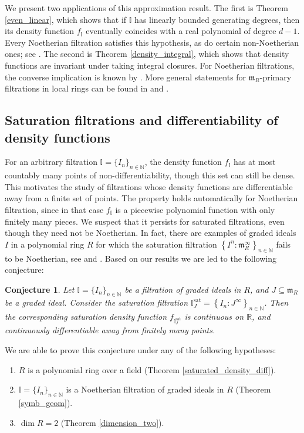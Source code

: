 \documentclass[12pt,a4paper]{amsart}
\theoremstyle{plain}
\newtheorem{conjecture}[theorem]{Conjecture}
\theoremstyle{definition}
\numberwithin{equation}{theorem}
\begin{document}
We present two applications of this approximation result. The first is Theorem \ref{even_linear}, which shows that if $\mathbb{I}$ has linearly bounded generating degrees, then its density function $f_{\mathbb{I}}$ eventually coincides with a real polynomial of degree $d-1$. Every Noetherian filtration satisfies this hypothesis, as do certain non-Noetherian ones; see \cite{HHT02}. The second is Theorem \ref{density_integral}, which shows that density functions are invariant under taking integral closures. For Noetherian filtrations, the converse implication is known by \cite{DRT26}. More general statements for $\mathfrak{m}_R$-primary filtrations in local rings can be found in \cite{Cut21} and \cite{BLQ24}.

\subsection*{Saturation filtrations and differentiability of density functions}

For an arbitrary filtration $\mathbb{I}=\{I_n\}_{n\in\mathbb N}$, the density function $f_{\mathbb{I}}$ has at most countably many points of non-differentiability, though this set can still be dense. This motivates the study of filtrations whose density functions are differentiable away from a finite set of points. The property holds automatically for Noetherian filtration, since in that case $f_{\mathbb{I}}$ is a piecewise polynomial function with only finitely many pieces. We suspect that it persists for saturated filtrations, even though they need not be Noetherian. In fact, there are examples of graded ideals $I$ in a polynomial ring $R$ for which the saturation filtration $\left\{I^n \colon \mathfrak{m}_R^{\infty}\right\}_{n\in\mathbb{N}}$ fails to be Noetherian, see \cite{Nagata59} and \cite{CHST05}. Based on our results we are led to the following conjecture:

\begin{conjecture}\label{conj1}
Let $\mathbb{I}=\{I_n\}_{n\in\mathbb{N}}$ be a filtration of graded ideals in $R$, and $J\subseteq \mathfrak{m}_R$ be a graded ideal. Consider the saturation filtration $\mathbb{I}^{\mathrm{sat}}_J = \left\{I_n \colon J^{\infty}\right\}_{n\in\mathbb{N}}$. Then the corresponding saturation density function $f_{\mathbb{I}^{\mathrm{sat}}_J}$ is continuous on $\mathbb{R}$, and continuously differentiable away from finitely many points.
\end{conjecture}

We are able to prove this conjecture under any of the following hypotheses:
\begin{enumerate}
 \item[$(i)$] $R$ is a polynomial ring over a field (Theorem \ref{saturated_density_diff}).
 \item[$(ii)$] $\mathbb{I}=\{I_n\}_{n\in\mathbb{N}}$ is a Noetherian filtration of graded ideals in $R$ (Theorem \ref{symb_geom}).
 \item[$(iii)$] $\dim R = 2$ (Theorem \ref{dimension_two}).
\end{enumerate}
\end{document}
